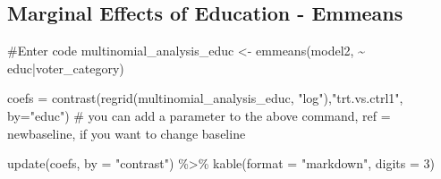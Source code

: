\documentclass[
  letterpaper,
  DIV=11,
  numbers=noendperiod]{scrartcl}
\newenvironment{Shaded}{\begin{snugshade}}{\end{snugshade}}
\newcommand{\AttributeTok}[1]{\textcolor[rgb]{0.40,0.45,0.13}{#1}}
\newcommand{\CommentTok}[1]{\textcolor[rgb]{0.37,0.37,0.37}{#1}}
\newcommand{\DecValTok}[1]{\textcolor[rgb]{0.68,0.00,0.00}{#1}}
\newcommand{\FunctionTok}[1]{\textcolor[rgb]{0.28,0.35,0.67}{#1}}
\newcommand{\NormalTok}[1]{\textcolor[rgb]{0.00,0.23,0.31}{#1}}
\newcommand{\OtherTok}[1]{\textcolor[rgb]{0.00,0.23,0.31}{#1}}
\newcommand{\SpecialCharTok}[1]{\textcolor[rgb]{0.37,0.37,0.37}{#1}}
\newcommand{\StringTok}[1]{\textcolor[rgb]{0.13,0.47,0.30}{#1}}
\begin{document}
\subsection{Marginal Effects of Education -
Emmeans}\label{marginal-effects-of-education---emmeans}

\begin{Shaded}
\begin{Highlighting}[]
\CommentTok{\#Enter code}
\NormalTok{multinomial\_analysis\_educ }\OtherTok{\textless{}{-}} \FunctionTok{emmeans}\NormalTok{(model2, }\SpecialCharTok{\textasciitilde{}}\NormalTok{ educ}\SpecialCharTok{|}\NormalTok{voter\_category)}

\NormalTok{coefs }\OtherTok{=} \FunctionTok{contrast}\NormalTok{(}\FunctionTok{regrid}\NormalTok{(multinomial\_analysis\_educ, }\StringTok{"log"}\NormalTok{),}\StringTok{"trt.vs.ctrl1"}\NormalTok{,  }\AttributeTok{by=}\StringTok{"educ"}\NormalTok{)}
\CommentTok{\# you can add a parameter to the above command, ref = newbaseline, if you want to change baseline}

\FunctionTok{update}\NormalTok{(coefs, }\AttributeTok{by =} \StringTok{"contrast"}\NormalTok{) }\SpecialCharTok{\%\textgreater{}\%} 
  \FunctionTok{kable}\NormalTok{(}\AttributeTok{format =} \StringTok{"markdown"}\NormalTok{, }\AttributeTok{digits =} \DecValTok{3}\NormalTok{)}
\end{Highlighting}
\end{Shaded}
\end{document}
